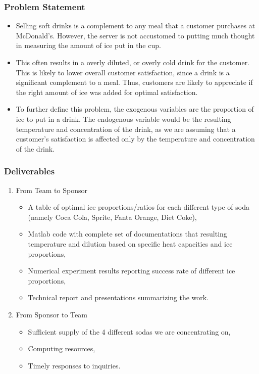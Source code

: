 \documentclass[compress,handout,10pt]{beamer}
\let\olditem\item
\renewcommand{\item}{\setlength{\itemsep}{0.5\baselineskip}\olditem}
\begin{document}
\begin{frame}
    \frametitle{Problem Statement}
     \begin{itemize}
         \item Selling soft drinks is a complement to any meal that a customer purchases at McDonald's. However, the server is not accustomed to putting much thought in measuring the amount of ice put in the cup.
\item This often results in a overly diluted, or overly cold drink for the customer. This is likely to lower overall customer satisfaction, since a drink is a significant complement to a meal. Thus, customers are likely to appreciate if the right amount of ice was added for optimal satisfaction.
\item To further define this problem, the exogenous variables are the proportion of ice to put in a drink. The endogenous variable would be the resulting temperature and concentration of the drink, as we are assuming that a customer's satisfaction is affected only by the temperature and concentration of the drink.
     \end{itemize}
\end{frame}


\begin{frame}
    \frametitle{Deliverables}
\begin{enumerate}
 \item From Team to Sponsor
\begin{itemize}
    \item A table of optimal ice proportions/ratios for each different type of soda (namely Coca Cola, Sprite, Fanta Orange, Diet Coke),
    \item Matlab code with complete set of documentations that resulting temperature and dilution based on specific heat capacities and ice proportions,
    \item Numerical experiment results reporting success rate of different ice proportions,
    \item Technical report and presentations summarizing the work. 
\end{itemize}

\item From Sponsor to Team
\begin{itemize}
    \item Sufficient supply of the 4 different sodas we are concentrating on,
    \item Computing resources,
    \item Timely responses to inquiries.
\end{itemize}
\end{enumerate}
\end{frame}
\end{document}
